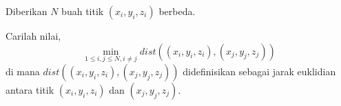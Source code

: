 Diberikan $N$ buah titik $(x_i,y_i,z_i)$ berbeda.

Carilah nilai, $$\min_{1\le{i,j}\le{N},i\neq{j}}{dist((x_i,y_i,z_i),(x_j,y_j,z_j))}$$ di mana $dist((x_i,y_i,z_i),(x_j,y_j,z_j))$ didefinisikan sebagai jarak euklidian antara titik $(x_i,y_i,z_i)$ dan $(x_j,y_j,z_j)$.
